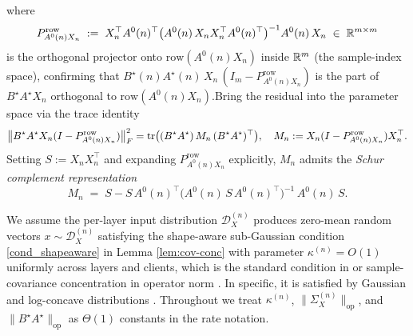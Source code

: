 where
\begin{equation}\label{row_projector}
P^\text{row}_{A^0(n)X_n} \;:=\; X_n^\top A^0(n)^\top \bigl(A^0(n)\,X_n X_n^\top A^0(n)^\top\bigr)^{-1} A^0(n)\,X_n \;\in\;\mathbb{R}^{m\times m}
\end{equation}
is the orthogonal projector onto $\mathrm{row}(A^0(n)X_n)$ inside $\mathbb{R}^m$ (the sample-index space), confirming that $B^\star(n)A^\star(n)\,X_n\,(I_m-P^\text{row}_{A^0(n) X_n})$ is the part of $B^\star A^\star X_n$ orthogonal to $\mathrm{row}(A^0(n)X_n)$.Bring the residual into the parameter space via the trace identity
\begin{equation} \label{residual}
\bigl\|B^\star A^\star X_n(I-P^\text{row}_{A^0(n)X_n})\bigr\|_F^2 =\mathrm{tr}\bigl((B^\star A^\star)\,M_n\,(B^\star A^\star)^\top\bigr),\quad M_n := X_n(I-P^\text{row}_{A^0(n)X_n})X_n^\top.
\end{equation} 
Setting $S := X_n X_n^\top$ and expanding $P^\text{row}_{A^0(n)X_n}$ explicitly, $M_n$ admits the \emph{Schur complement representation}
\begin{equation} \label{M_n}
M_n \;=\; S - S\,A^0(n)^\top\bigl(A^0(n)\,S\,A^0(n)^\top\bigr)^{-1}\,A^0(n)\,S.
\end{equation}

We assume the per-layer input distribution $\mathcal D_X^{(n)}$ produces zero-mean random vectors $x\sim\mathcal D_X^{(n)}$ satisfying the shape-aware sub-Gaussian condition \eqref{cond_shapeaware} in Lemma \ref{lem:cov-conc} with parameter $\kappa^{(n)}=O(1)$ uniformly across layers and clients, which is the standard condition in or sample-covariance concentration in operator norm \cite{vershynin2018}. In specific, it is satisfied by Gaussian and log-concave distributions \cite{vershynin2018}. Throughout we treat $\kappa^{(n)}$, $\|\Sigma_X^{(n)}\|_\text{op}$, and $\|B^\star A^\star\|_\text{op}$ as $\Theta(1)$ constants in the rate notation. 


